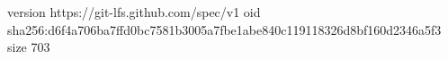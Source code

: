 version https://git-lfs.github.com/spec/v1
oid sha256:d6f4a706ba7ffd0bc7581b3005a7fbe1abe840c119118326d8bf160d2346a5f3
size 703
